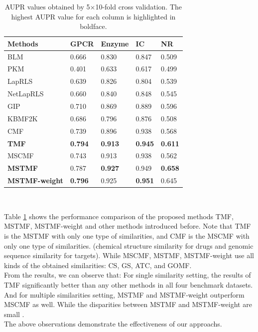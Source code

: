 \documentclass{article}
\begin{document}
\begin{table}[htbp]
\caption{AUPR values obtained by 5$\times$10-fold cross validation. The highest AUPR value for each column is highlighted in boldface. }\label{results_comp_with_other_methods}
\centering
{}
\begin{tabular}{lllll}
\toprule
Methods & GPCR & Enzyme & IC & NR\\
\midrule
BLM & 0.666 & 0.830 & 0.847 & 0.509 \\
PKM & 0.401 & 0.633  & 0.617 & 0.499 \\
LapRLS & 0.639 & 0.826 & 0.804 & 0.539\\
NetLapRLS & 0.660 & 0.840 & 0.848 & 0.545\\
GIP	 & 0.710 & 0.869 & 0.889 & 0.596\\
KBMF2K & 0.686 & 0.796 & 0.876 & 0.508 \\
CMF & 0.739 & 0.896 & 0.938 & 0.568\\
\textbf{TMF} & \textbf{0.794} & \textbf{0.913} & \textbf{0.945} & \textbf{0.611} \\ 
\midrule
MSCMF & 0.743 & 0.913 & 0.938 & 0.562 \\
\textbf{MSTMF} & 0.787 & \textbf{0.927} & 0.949 & \textbf{0.658} \\
\textbf{MSTMF-weight} & \textbf{0.796} & 0.925 & \textbf{0.951} & 0.645\\
\bottomrule
\end{tabular} \\
\end{table}


Table \ref{results_comp_with_other_methods} shows the performance comparison of the proposed methods TMF, MSTMF, MSTMF-weight and other methods introduced before. Note that TMF is the MSTMF with only one type of similarities, and CMF is the MSCMF with only one type of similarities. (chemical structure similarity for drugs and genomic sequence similarity for targets). While MSCMF, MSTMF, MSTMF-weight use all kinds of the obtained similarities: CS, GS, ATC, and GOMF. \\
\indent From the results, we can observe that:  
For single similarity setting, the results of TMF significantly better than any other methods in all four benchmark datasets. 
And for multiple similarities setting, MSTMF and MSTMF-weight outperform MSCMF as well. While the disparities between MSTMF and MSTMF-weight are small . \\
\indent The above observations demonstrate the effectiveness of our approachs.\\
\end{document}
